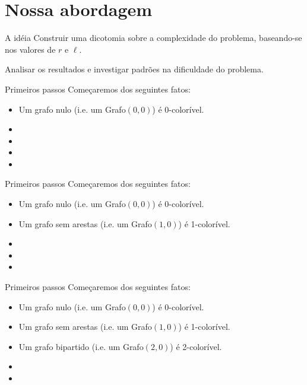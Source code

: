\documentclass[9pt, compress]{beamer}
\begin{document}
    \section{Nossa abordagem}
    \begin{frame}{A idéia}
      Construir uma dicotomia sobre a complexidade do problema, baseando-se nos valores de $r$ e $\ell$.
      
      Analisar os resultados e investigar padrões na dificuldade do problema.
    \end{frame}
    \begin{frame}{Primeiros passos}
      Começaremos dos seguintes fatos:
      \begin{itemize}
        \item Um grafo nulo (i.e. um Grafo$(0,0)$) é 0-colorível.
        \item 
        \item 
        \item 
         \item                                                                                                                
      \end{itemize}
    \end{frame}
    \begin{frame}{Primeiros passos}
      Começaremos dos seguintes fatos:
      \begin{itemize}
        \item Um grafo nulo (i.e. um Grafo$(0,0)$) é 0-colorível.
        \item Um grafo sem arestas (i.e. um Grafo$(1,0)$) é 1-colorível.
        \item 
        \item 
         \item                                                                                                                
      \end{itemize}
    \end{frame}
    \begin{frame}{Primeiros passos}
      Começaremos dos seguintes fatos:
      \begin{itemize}
        \item Um grafo nulo (i.e. um Grafo$(0,0)$) é 0-colorível.
        \item Um grafo sem arestas (i.e. um Grafo$(1,0)$) é 1-colorível.
        \item Um grafo bipartido (i.e. um Grafo$(2,0)$) é 2-colorível.
        \item 
         \item                                                                                                                
      \end{itemize}
    \end{frame}
\end{document}
